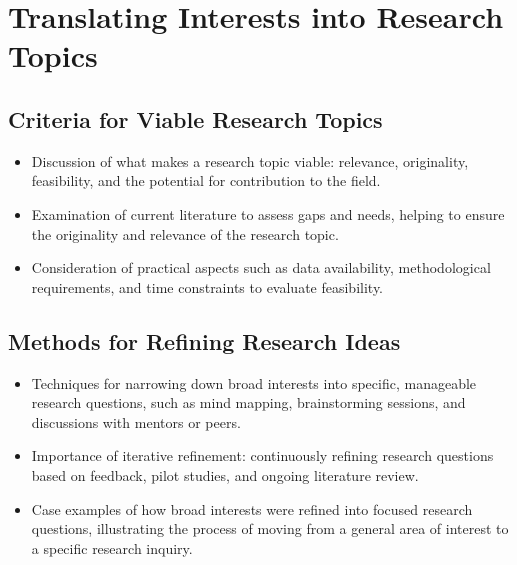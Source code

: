 \documentclass[
]{book}
\begin{document}
\hypertarget{translating-interests-into-research-topics}{%
\section*{Translating Interests into Research Topics}\label{translating-interests-into-research-topics}}

\hypertarget{criteria-for-viable-research-topics}{%
\subsection*{Criteria for Viable Research Topics}\label{criteria-for-viable-research-topics}}

\begin{itemize}
\item
  Discussion of what makes a research topic viable: relevance, originality, feasibility, and the potential for contribution to the field.
\item
  Examination of current literature to assess gaps and needs, helping to ensure the originality and relevance of the research topic.
\item
  Consideration of practical aspects such as data availability, methodological requirements, and time constraints to evaluate feasibility.
\end{itemize}

\hypertarget{methods-for-refining-research-ideas}{%
\subsection*{Methods for Refining Research Ideas}\label{methods-for-refining-research-ideas}}

\begin{itemize}
\item
  Techniques for narrowing down broad interests into specific, manageable research questions, such as mind mapping, brainstorming sessions, and discussions with mentors or peers.
\item
  Importance of iterative refinement: continuously refining research questions based on feedback, pilot studies, and ongoing literature review.
\item
  Case examples of how broad interests were refined into focused research questions, illustrating the process of moving from a general area of interest to a specific research inquiry.
\end{itemize}
\end{document}
